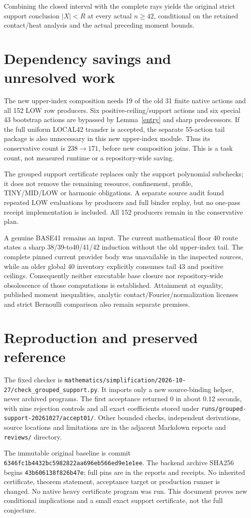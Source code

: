 \documentclass[11pt]{article}
\begin{document}
Combining the closed interval with the complete rays yields the original
strict support conclusion $|X|<R$ at every actual $n\ge42$, conditional on
the retained contact/heat analysis and the actual preceding moment bounds.

\section{Dependency savings and unresolved work}
The new upper-index composition needs 19 of the old 31 finite native actions
and all 152 LOW row producers. Six positive-ceiling/support actions and six
special 43 bootstrap actions are bypassed by Lemma~\ref{entry} and sharp
predecessors. If the full uniform LOCAL42 transfer is accepted, the separate
55-action tail package is also unnecessary in this new upper-index module.
Thus its conservative count is $238\to171$, before new composition joins.
This is a task count, not measured runtime or a repository-wide saving.

The grouped support certificate replaces only the support polynomial
subchecks; it does not remove the remaining resource, confinement, profile,
TINY/MID/LOW or harmonic obligations. A separate source audit found repeated
LOW evaluations by producers and full binder replay, but no one-pass receipt
implementation is included. All 152 producers remain in the conservative plan.

A genuine BASE41 remains an input. The current mathematical floor 40 route
states a sharp 38/39-to40/41/42 induction without the old upper-index tail.
The complete pinned current provider body was unavailable in the inspected
sources, while an older global 40 inventory explicitly consumes tail 43 and
positive ceilings. Consequently neither executable base closure nor
repository-wide obsolescence of those computations is established.
Attainment at equality, published moment inequalities, analytic
contact/Fourier/normalization licenses and strict Bernoulli comparison also
remain separate premises.

\section{Reproduction and preserved reference}
The fixed checker is
\texttt{mathematics/simplification/2026-10-27/check\_grouped\_support.py}.
It imports only a new source-binding helper, never archived programs.
The first acceptance returned 0 in about 0.12 seconds, with nine rejection
controls and all exact coefficients stored under
\texttt{runs/grouped-support-20261027/accept01/}.
Other bounded checks, independent derivations, source locations and limitations
are in the adjacent Markdown reports and \texttt{reviews/} directory.

The immutable original baseline is commit
\texttt{6346fc1b4432bc5982822aa696eb566ed9e1e1ee}.
The backend archive SHA256 begins \texttt{43b606138f826b47e}; full pins are in
the reports and receipts. No inherited certificate, theorem statement,
acceptance target or production runner is changed. No native heavy
certificate program was run. This document proves new conditional
implications and a small exact support certificate, not the full conjecture.
\end{document}
